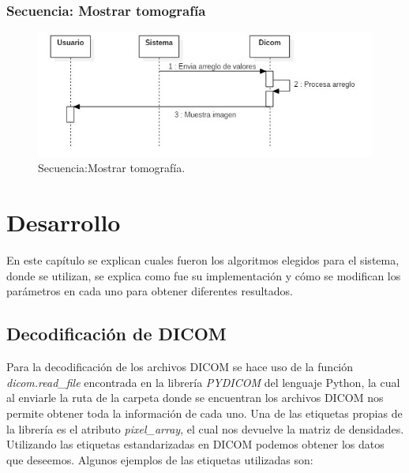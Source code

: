 \documentclass[12pt]{report}
\begin{document}
\subsection{Secuencia: Mostrar tomografía}
\begin{figure}[H]
\centering
\includegraphics[width = 12 cm, height = 7 cm]{mostrar_tomografia}
\caption{Secuencia:Mostrar tomografía.}
\end{figure}


\chapter{Desarrollo}
En este capítulo se explican cuales fueron los algoritmos elegidos para el sistema, donde se utilizan, se explica como fue su implementación y cómo se modifican los parámetros en cada uno para obtener diferentes resultados.

\section{Decodificación de DICOM}
Para la decodificación de los archivos DICOM se hace uso de la función \textit{dicom.read\_file} encontrada en la librería \textit{PYDICOM} del lenguaje Python, la cual al enviarle la ruta de la carpeta donde se encuentran los archivos DICOM nos permite obtener toda la información de cada uno. Una de las etiquetas propias de la librería es  el atributo \textit{pixel\_array}, el cual nos devuelve la matriz de densidades. Utilizando las etiquetas estandarizadas en DICOM podemos obtener los datos que deseemos. Algunos ejemplos de las etiquetas utilizadas son:
\end{document}
